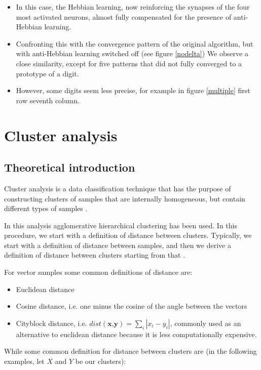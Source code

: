 \documentclass[a4paper]{report}
\begin{document}
\begin{itemize}
    \item In this case, the Hebbian learning, now reinforcing the synapses of the four most activated neurons, almost fully compensated for the presence of anti-Hebbian learning.
    \item Confronting this with the convergence pattern of the original algorithm, but with anti-Hebbian learning switched off  (see figure \ref{nodelta}) We observe a close similarity, except for five patterns that did not fully converged to a prototype of a digit.
    \item However, some digits seem less precise, for example in figure \ref{multiple} first row seventh column.
\end{itemize}

\chapter{Cluster analysis}

\section{Theoretical introduction}

Cluster analysis is a data classification technique that has the purpose of constructing clusters of samples that are internally homogeneous, but contain different types of samples \cite{romesburg2004cluster}.

In this analysis agglomerative hierarchical clustering has been used.
In this procedure, we start with a definition of distance between clusters.
Typically, we start with a definition of distance between samples, and then we derive a definition of distance between clusters starting from that \cite{day1984efficient}.

For vector samples some common definitions of distance are:
\begin{itemize}
	\item Euclidean distance
	\item Cosine distance, i.e. one minus the cosine of the angle between the vectors
	\item Cityblock distance, i.e. $dist(\textbf{x,y}) = \sum_i |x_i-y_i|$, commonly used as an alternative to euclidean distance because it is less computationally expensive.
\end{itemize}

While some common definition for distance between clusters are (in the following examples, let $X$ and $Y$ be our clusters):
\end{document}
